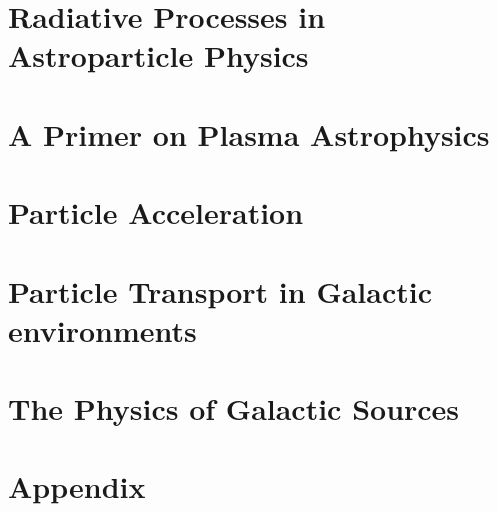 \documentclass[letterpaper, 11pt, notitlepage]{report}
\begin{document}
\newpage

\tableofcontents\label{sec:contents}

\chapter{Radiative Processes in Astroparticle Physics}


\newpage

\chapter{A Primer on Plasma Astrophysics}




\newpage

\chapter{Particle Acceleration}

\newpage

\chapter{Particle Transport in Galactic environments}


\newpage

\chapter{The Physics of Galactic Sources}

\newpage

\newpage
\chapter{Appendix}




\newpage



\end{document}
